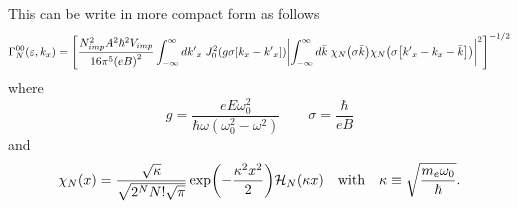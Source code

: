\noindent
This can be write in more compact form as follows
\begin{equation} \label{5.8}
  \begin{aligned}
    \Gamma^{00}_{N}(\varepsilon,k_x)  =
    \qty[
    \frac { N_{imp}^2 A^2 \hbar^2 V_{imp}}{16\pi^5 \qty(eB)^2}
    \int_{-\infty}^{\infty} d {k'}_x \;
    J_0^2\qty(g\sigma[{k}_x - {k'}_x])
    \qty|
    \int_{-\infty}^{\infty} d\bar{k} \;
    {\chi}_{N}\qty(\sigma\bar{k})
    {\chi}_{N}\qty(\sigma\qty[{k'}_x - {k}_x - \bar{k}])|^2
    ]^{-1/2}
  \end{aligned}
\end{equation}
where
\begin{equation} \label{5.9}
    g = \frac{eE\omega_0^2}{\hbar\omega(\omega_0^2 - \omega^2)} \quad\quad
    \sigma = \frac{\hbar}{eB}
\end{equation}
and
\begin{equation} \label{5.10}
  \chi_N(x) = \frac{\sqrt{\kappa}}{\sqrt{2^{N}N!\sqrt{\pi}}}
  \exp(-\frac{\kappa^2 x^2}{2})
  \mathcal{H}_N\qty(\kappa x) \quad \text{with} \quad
  \kappa \equiv \sqrt{\frac{m_e \omega_0}{\hbar}}.
\end{equation}

